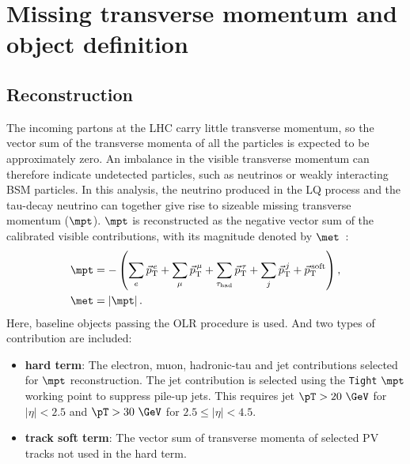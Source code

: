 \section{Missing transverse momentum and object definition}
\label{sec:ch6_met}

\subsection{Reconstruction}

The incoming partons at the LHC carry little transverse momentum, so the vector sum of the transverse momenta of all the particles is expected to be approximately zero.
An imbalance in the visible transverse momentum can therefore indicate undetected particles, such as neutrinos or weakly interacting BSM particles.
In this analysis, the neutrino produced in the LQ process and the tau-decay neutrino can together give rise to sizeable missing transverse momentum ($\mpt$).
$\mpt$ is reconstructed as the negative vector sum of the calibrated visible contributions, with its magnitude denoted by $\met$~\cite{ATLAS2025METPerformance}:
\begin{align}
    \mpt
    &=-\left(
    \sum_e\vec p_{\mathrm{T}}^{\,e}
    +\sum_\mu\vec p_{\mathrm{T}}^{\,\mu}
    +\sum_{\tau_{\mathrm{had}}}\vec p_{\mathrm{T}}^{\,\tau}
    +\sum_j\vec p_{\mathrm{T}}^{\,j}
    +\vec p_{\mathrm{T}}^{\,\mathrm{soft}}
    \right),
    \label{eq:ch6_met_vector}\\
    \met&=\left|\mpt\right|.
    \label{eq:ch6_met_magnitude}
\end{align}
Here, baseline objects passing the OLR procedure is used. And two types of contribution are included:
\begin{itemize}
    \item \textbf{hard term}: The electron, muon, hadronic-tau and jet contributions selected for $\mpt$ reconstruction.
    The jet contribution is selected using the \texttt{Tight} $\mpt$ working point to suppress pile-up jets.
    This requires jet $\pT>20~\GeV$ for $|\eta|<2.5$ and $\pT>30~\GeV$ for $2.5\leq|\eta|<4.5$.
    \item \textbf{track soft term}: The vector sum of transverse momenta of selected PV tracks not used in the hard term.
\end{itemize}
